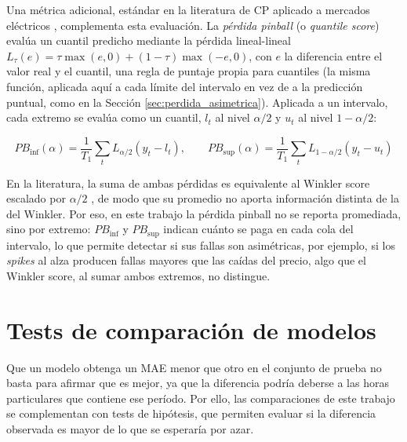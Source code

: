 Una métrica adicional, estándar en la literatura de CP aplicado a mercados eléctricos \cite{KathZiel2021}, complementa esta evaluación. La \textit{pérdida pinball} (o \textit{quantile score}) evalúa un cuantil predicho mediante la pérdida lineal-lineal $L_\tau(e) = \tau\max(e,0) + (1-\tau)\max(-e,0)$, con $e$ la diferencia entre el valor real y el cuantil, una regla de puntaje propia para cuantiles \cite{GneitingRaftery2007} (la misma función, aplicada aquí a cada límite del intervalo en vez de a la predicción puntual, como en la Sección \ref{sec:perdida_asimetrica}). Aplicada a un intervalo, cada extremo se evalúa como un cuantil, $l_t$ al nivel $\alpha/2$ y $u_t$ al nivel $1-\alpha/2$:

\begin{equation}
    PB_{\text{inf}}(\alpha) = \frac{1}{T_1}\sum_{t} L_{\alpha/2}(y_t - l_t), \qquad PB_{\text{sup}}(\alpha) = \frac{1}{T_1}\sum_{t} L_{1-\alpha/2}(y_t - u_t)
    \label{eq:pinball_cp}
\end{equation}

En la literatura, la suma de ambas pérdidas es equivalente al Winkler score escalado por $\alpha/2$ \cite{Bracher2021}, de modo que su promedio no aporta información distinta de la del Winkler. Por eso, en este trabajo la pérdida pinball no se reporta promediada, sino por extremo: $PB_{\text{inf}}$ y $PB_{\text{sup}}$ indican cuánto se paga en cada cola del intervalo, lo que permite detectar si sus fallas son asimétricas, por ejemplo, si los \textit{spikes} al alza producen fallas mayores que las caídas del precio, algo que el Winkler score, al sumar ambos extremos, no distingue.

\section{Tests de comparación de modelos}
\label{sec:tests_comparacion}

Que un modelo obtenga un MAE menor que otro en el conjunto de prueba no basta para afirmar que es mejor, ya que la diferencia podría deberse a las horas particulares que contiene ese período. Por ello, las comparaciones de este trabajo se complementan con tests de hipótesis, que permiten evaluar si la diferencia observada es mayor de lo que se esperaría por azar.

